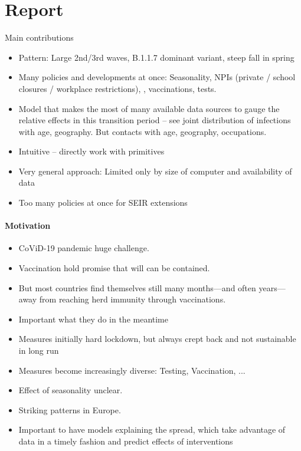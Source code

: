 \section{Report}

Main contributions
\begin{itemize}
      \item Pattern: Large 2nd/3rd waves, B.1.1.7 dominant variant, steep fall in spring
      \item Many policies and developments at once: Seasonality, NPIs (private / school closures / workplace restrictions), , vaccinations, tests.
      \item Model that makes the most of many available data sources to gauge the relative effects in this transition period -- see joint distribution of infections with age, geography. But contacts with age, geography, occupations. 
      \item Intuitive -- directly work with primitives
      \item Very general approach: Limited only by size of computer and availability of data
      \item Too many policies at once for SEIR extensions
\end{itemize}




\paragraph{Motivation}
\begin{itemize}
    \item CoViD-19 pandemic huge challenge. 
    \item Vaccination hold promise that will can be contained. 
    \item But most countries find themselves still many months---and often years---away from reaching herd immunity through vaccinations.
    \item Important what they do in the meantime
    \item Measures initially hard lockdown, but always crept back and not sustainable in long run
    \item Measures become increasingly diverse: Testing, Vaccination, ...
    \item Effect of seasonality unclear.
    \item Striking patterns in Europe. 
    \item Important to have models explaining the spread, which take advantage of data in a timely fashion and predict effects of interventions
\end{itemize}

